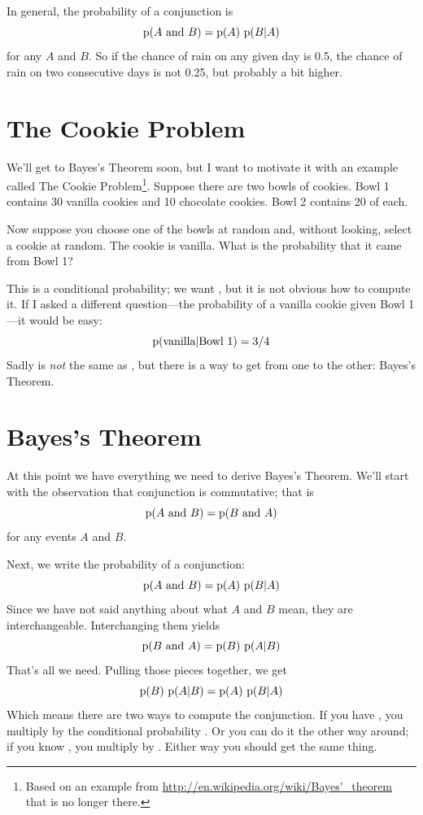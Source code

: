 \documentclass[12pt]{book}
\begin{document}
In general, the probability of a conjunction is
%
\[ \mathrm{p}(A ~\mathrm{and}~ B) = \mathrm{p}(A)~\mathrm{p}(B|A) \]
%
for any $A$ and $B$.  So if the chance of rain on any given day
is 0.5, the chance of rain on two consecutive days is not
0.25, but probably a bit higher.


\section{The Cookie Problem}

We'll get to Bayes's Theorem soon, but I want to motivate it with an
example called The Cookie Problem\footnote{Based on an example from
  \url{http://en.wikipedia.org/wiki/Bayes'_theorem} that is no longer
  there.}.  Suppose there are two bowls of cookies.  Bowl 1 contains
  30 vanilla cookies and 10 chocolate cookies.  Bowl 2 contains 20 of
  each.

Now suppose you choose one of the bowls at random and, without
looking, select a cookie at random.  The cookie is vanilla.  What is
the probability that it came from Bowl 1?

This is a conditional probability; we want , but it is not obvious how to compute it.  If I asked a
different question---the probability of a vanilla cookie given Bowl
1---it would be easy:
%
\[ \mathrm{p}(\mbox{vanilla} | \mbox{Bowl 1}) = 3/4 \]
%
Sadly  is {\em not} the same as , but there
is a way to get from one to the other: Bayes's Theorem.


\section{Bayes's Theorem}

At this point we have everything we need to derive Bayes's Theorem.
We'll start with the observation that conjunction is commutative; that is
%
\[ \mathrm{p}(A ~\mathrm{and}~ B) = \mathrm{p}(B ~\mathrm{and}~ A) \]
%
for any events $A$ and $B$.

Next, we write the probability of a conjunction:
%
\[ \mathrm{p}(A ~\mathrm{and}~ B) = \mathrm{p}(A)~\mathrm{p}(B|A) \]
%
Since we have not said anything about what $A$ and $B$ mean, they
are interchangeable.  Interchanging them yields
%
\[ \mathrm{p}(B ~\mathrm{and}~ A) = \mathrm{p}(B)~\mathrm{p}(A|B) \]
%
That's all we need.  Pulling those pieces together, we get
%
\[ \mathrm{p}(B)~\mathrm{p}(A|B) = \mathrm{p}(A)~\mathrm{p}(B|A) \]
%
Which means there are two ways to compute the conjunction.
If you have , you multiply by the conditional
probability .  Or you can do it the other way around; if you
know , you multiply by .  Either way you should get
the same thing.
\end{document}
